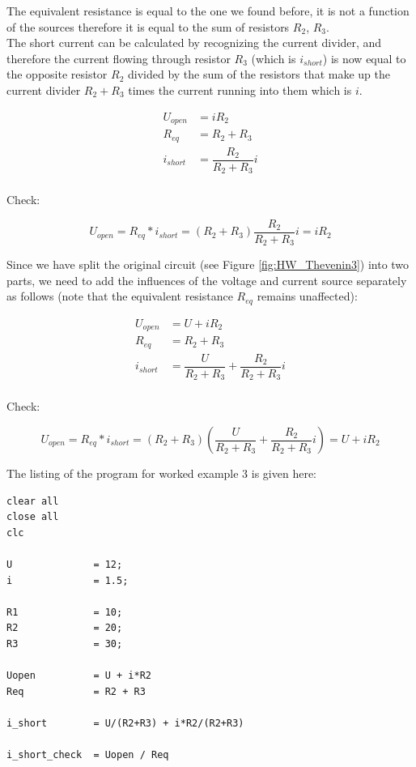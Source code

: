 \documentclass[11pt,letterpaper]{article}
\begin{document}
The equivalent resistance is equal to the one we found before, it is not a function of the sources therefore it is equal to the sum of resistors $R_2$, $R_3$.\\
 
The short current can be calculated by recognizing the current divider, and therefore the current flowing through resistor $R_3$ (which is $i_{short}$) is now equal to the opposite resistor $R_2$ divided by the sum of the resistors that make up the current divider $R_2 + R_3$  times the current running into them which is $i$.

\begin{align}\label{Eqn:HW_Thevenin4}
U_{open} &= i R_2 \\
R_{eq}  &= R_2 + R_3 \\
i_{short} &=  \dfrac{R_2}{R_2+R_3} i\\
\end{align}

Check:

\begin{equation}
U_{open} = R_{eq} * i_{short} = \left( R_2 + R_3 \right) \dfrac{R_2}{R_2+R_3} i = i R_2
\end{equation}

Since we have split the original circuit (see Figure \ref{fig:HW_Thevenin3}) into two parts, we need to add the influences of the voltage and current source separately as follows (note that the equivalent resistance $R_{eq}$ remains unaffected):

\begin{align}\label{Eqn:HW_Thevenin5}
U_{open} &= U + i R_2 \\
R_{eq}   &= R_2 + R_3 \\
i_{short} &= \dfrac{U}{R_2+R_3} +  \dfrac{R_2}{R_2+R_3} i\\
\end{align}

Check:

\begin{equation}
U_{open} = R_{eq} * i_{short} = \left( R_2 + R_3 \right) \left(  \dfrac{U}{R_2+R_3} +  \dfrac{R_2}{R_2+R_3} i\right)  = U + i R_2 
\end{equation}

\newpage
The listing of the program for worked example 3 is given here:

\begin{lstlisting}
clear all
close all
clc

U              = 12;
i              = 1.5;

R1             = 10;
R2             = 20;
R3             = 30;

Uopen          = U + i*R2
Req            = R2 + R3

i_short        = U/(R2+R3) + i*R2/(R2+R3)

i_short_check  = Uopen / Req
\end{lstlisting}
\end{document}
